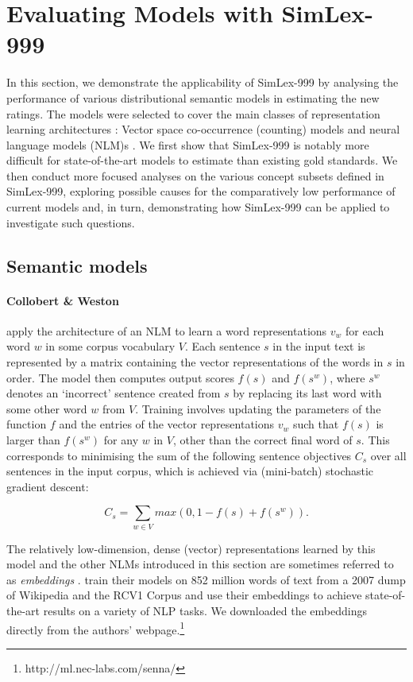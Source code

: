\documentclass[fullname]{clv2}
\begin{document}
\section{Evaluating Models with SimLex-999}

In this section, we demonstrate the applicability of SimLex-999 by analysing the performance of various distributional semantic models in estimating the new ratings. The models were selected to cover the main classes of representation learning architectures \cite{baroni2014don}: Vector space co-occurrence (counting) models and neural language models (NLM)s \cite{bengio2003}. We first show that SimLex-999 is notably more difficult for state-of-the-art models to estimate than existing gold standards. We then conduct more focused analyses on the various concept subsets defined in SimLex-999, exploring possible causes for the comparatively low performance of current models and, in turn, demonstrating how SimLex-999 can be applied to investigate such questions.    

\subsection{Semantic models}

\paragraph{\bf Collobert \& Weston}

 apply the architecture of an NLM to learn a word representations \(v_w\) for each word \(w\) in some corpus vocabulary \( V\). Each sentence \( s\) in the input text is represented by a matrix containing the vector representations of the words in \(s\) in order. The model then computes output scores \(f(s) \) and \(f(s^w) \), where \(s^w\) denotes an `incorrect' sentence created from \(s\) by replacing its last word with some other word \( w\) from \(V\). Training involves updating the parameters of the function \(f\) and the entries of the vector representations \(v_w\) such that  \(f(s)\) is larger than \(f(s^w) \) for any \(w\) in \(V\), other than the correct final word of \(s\). This corresponds to minimising the sum of the following sentence objectives \( C_s\) over all sentences in the input corpus, which is achieved via (mini-batch) stochastic gradient descent:

\[ C_{s}  = \sum_{w \in V} max(0,1-f(s) + f(s^w)). \]

The relatively low-dimension, dense (vector) representations learned by this model and the other NLMs introduced in this section are sometimes referred to as \emph{embeddings} \cite{turian2010word}.  train their models on 852 million words of text from a 2007 dump of Wikipedia and the RCV1 Corpus \cite{lewis2004rcv1} and use their embeddings to achieve state-of-the-art results on a variety of NLP tasks. We downloaded the embeddings directly from the authors' webpage.\footnote{http://ml.nec-labs.com/senna/}
\end{document}
